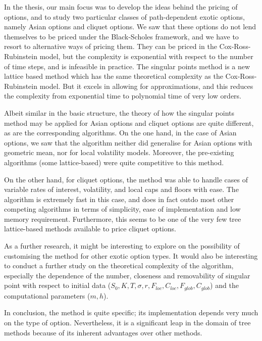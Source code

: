 

In the thesis, our main focus was to develop the ideas behind the pricing of options, and to study two particular classes of path-dependent exotic options, namely Asian options and cliquet options. We saw that these options do not lend themselves to be priced under the Black-Scholes framework, and we have to resort to alternative ways of pricing them. They can be priced in the Cox-Ross-Rubinstein model, but the complexity is exponential with respect to the number of time steps, and is infeasible in practice. The singular points method is a new lattice based method which has the same theoretical complexity as the Cox-Ross-Rubinstein model. But it excels in allowing for approximations, and this reduces the complexity from exponential time to polynomial time of very low orders.

Albeit similar in the basic structure, the theory of how the singular points method may be applied for Asian options and cliquet options are quite different, as are the corresponding algorithms. On the one hand, in the case of Asian options, we saw that the algorithm neither did generalise for Asian options with geometric mean, nor for local volatility models. Moreover, the pre-existing algorithms (some lattice-based) were quite competitive to this method.

On the other hand, for cliquet options, the method was able to handle cases of variable rates of interest, volatility, and local caps and floors with ease. The algorithm is extremely fast in this case, and does in fact outdo most other competing algorithms in terms of simplicity, ease of implementation and low memory requirement. Furthermore, this seems to be one of the very few tree lattice-based methods available to price cliquet options.

As a further research, it might be interesting to explore on the possibility of customising the method for other exotic option types. It would also be interesting to conduct a further study on the theoretical complexity of the algorithm, especially the dependence of the number, closeness and removability of singular point with respect to initial data ($ S_0, K, T, \sigma, r, F_{loc}, C_{loc}, F_{glob}, C_{glob} $) and the computational parameters ($ m, h $).

In conclusion, the method is quite specific; its implementation depends very much on the type of option. Nevertheless, it is a significant leap in the domain of tree methods because of its inherent advantages over other methods.


